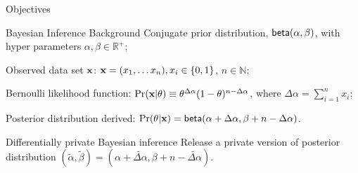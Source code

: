 \documentclass[final,hyperref={pdfpagelabels=false}]{beamer}
\begin{document}
\begin{frame}[t]
\begin{columns}[t]
\begin{column}{.485\textwidth}
\begin{block}{Objectives}

\end{block}

            
\begin{block}{Bayesian Inference Background}
Conjugate prior distribution, $\mathsf{beta}(\alpha, \beta)$, with hyper parameters $\alpha,\beta\in\mathbb{R}^{+}$;

Observed data set $\textbf{x}$: $\textbf{x}= (x_1,\dots x_n), x_i\in\{0,1\}$, $n\in\mathbb{N}$;

Bernoulli likelihood function: $\Pr(\textbf{x} | \theta)\equiv \theta^{\Delta \alpha}(1-\theta)^{n - \Delta \alpha}$, where $\Delta \alpha = \displaystyle\sum_{i=1}^{n}x_i$;

Posterior distribution derived: 
$\Pr(\theta|\textbf{x})=\mathsf{beta}(\alpha + \Delta \alpha,\beta + n - \Delta \alpha)$.

\end{block}


\begin{block}{Differentially private Bayesian inference}
Release a private version of posterior distribution $(\tilde\alpha,\tilde\beta)=(\alpha +  \widetilde{\Delta \alpha},\beta + n - \widetilde{\Delta \alpha})$.


\end{block}
\end{column}
\end{columns}
\end{frame}
\end{document}
